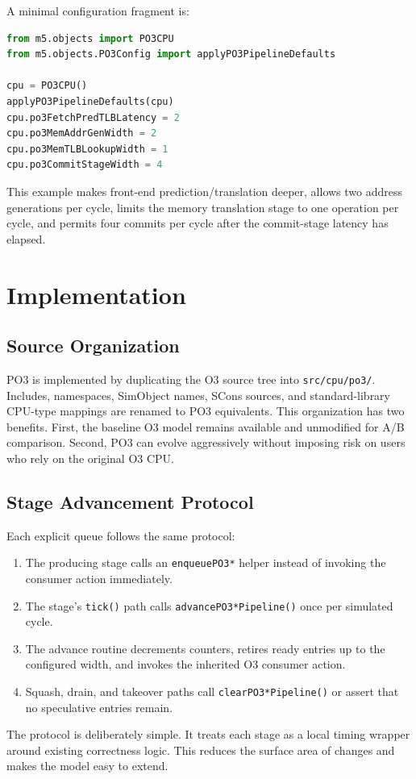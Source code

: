\documentclass[10pt,twocolumn]{article}
\newcommand{\po}{\textsc{PO3}}
\newcommand{\oo}{\textsc{O3}}
\begin{document}
A minimal configuration fragment is:
\begin{lstlisting}[language=Python]
from m5.objects import PO3CPU
from m5.objects.PO3Config import applyPO3PipelineDefaults

cpu = PO3CPU()
applyPO3PipelineDefaults(cpu)
cpu.po3FetchPredTLBLatency = 2
cpu.po3MemAddrGenWidth = 2
cpu.po3MemTLBLookupWidth = 1
cpu.po3CommitStageWidth = 4
\end{lstlisting}
This example makes front-end prediction/translation deeper, allows two address generations per cycle, limits the memory translation stage to one operation per cycle, and permits four commits per cycle after the commit-stage latency has elapsed.

\section{Implementation}
\subsection{Source Organization}
\po{} is implemented by duplicating the \oo{} source tree into \texttt{src/cpu/po3/}.  Includes, namespaces, SimObject names, SCons sources, and standard-library CPU-type mappings are renamed to \po{} equivalents.  This organization has two benefits.  First, the baseline \oo{} model remains available and unmodified for A/B comparison.  Second, \po{} can evolve aggressively without imposing risk on users who rely on the original \oo{} CPU.

\subsection{Stage Advancement Protocol}
Each explicit queue follows the same protocol:
\begin{enumerate}
  \item The producing stage calls an \texttt{enqueuePO3*} helper instead of invoking the consumer action immediately.
  \item The stage's \texttt{tick()} path calls \texttt{advancePO3*Pipeline()} once per simulated cycle.
  \item The advance routine decrements counters, retires ready entries up to the configured width, and invokes the inherited \oo{} consumer action.
  \item Squash, drain, and takeover paths call \texttt{clearPO3*Pipeline()} or assert that no speculative entries remain.
\end{enumerate}
The protocol is deliberately simple.  It treats each stage as a local timing wrapper around existing correctness logic.  This reduces the surface area of changes and makes the model easy to extend.
\end{document}
